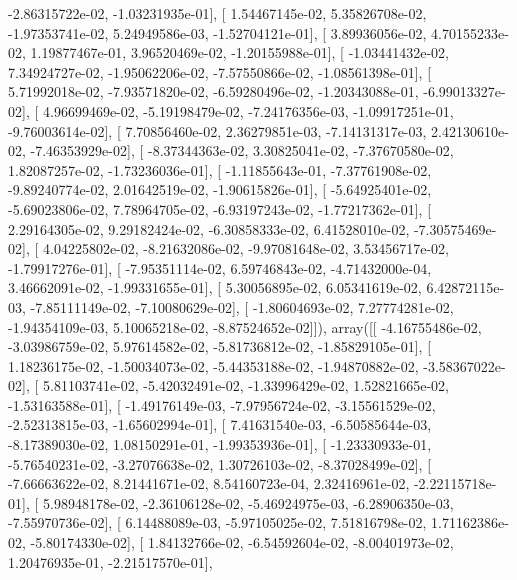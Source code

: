 \documentclass{article}
\begin{document}
         -2.86315722e-02,  -1.03231935e-01],
       [  1.54467145e-02,   5.35826708e-02,  -1.97353741e-02,
          5.24949586e-03,  -1.52704121e-01],
       [  3.89936056e-02,   4.70155233e-02,   1.19877467e-01,
          3.96520469e-02,  -1.20155988e-01],
       [ -1.03441432e-02,   7.34924727e-02,  -1.95062206e-02,
         -7.57550866e-02,  -1.08561398e-01],
       [  5.71992018e-02,  -7.93571820e-02,  -6.59280496e-02,
         -1.20343088e-01,  -6.99013327e-02],
       [  4.96699469e-02,  -5.19198479e-02,  -7.24176356e-03,
         -1.09917251e-01,  -9.76003614e-02],
       [  7.70856460e-02,   2.36279851e-03,  -7.14131317e-03,
          2.42130610e-02,  -7.46353929e-02],
       [ -8.37344363e-02,   3.30825041e-02,  -7.37670580e-02,
          1.82087257e-02,  -1.73236036e-01],
       [ -1.11855643e-01,  -7.37761908e-02,  -9.89240774e-02,
          2.01642519e-02,  -1.90615826e-01],
       [ -5.64925401e-02,  -5.69023806e-02,   7.78964705e-02,
         -6.93197243e-02,  -1.77217362e-01],
       [  2.29164305e-02,   9.29182424e-02,  -6.30858333e-02,
          6.41528010e-02,  -7.30575469e-02],
       [  4.04225802e-02,  -8.21632086e-02,  -9.97081648e-02,
          3.53456717e-02,  -1.79917276e-01],
       [ -7.95351114e-02,   6.59746843e-02,  -4.71432000e-04,
          3.46662091e-02,  -1.99331655e-01],
       [  5.30056895e-02,   6.05341619e-02,   6.42872115e-03,
         -7.85111149e-02,  -7.10080629e-02],
       [ -1.80604693e-02,   7.27774281e-02,  -1.94354109e-03,
          5.10065218e-02,  -8.87524652e-02]]), array([[ -4.16755486e-02,  -3.03986759e-02,   5.97614582e-02,
         -5.81736812e-02,  -1.85829105e-01],
       [  1.18236175e-02,  -1.50034073e-02,  -5.44353188e-02,
         -1.94870882e-02,  -3.58367022e-02],
       [  5.81103741e-02,  -5.42032491e-02,  -1.33996429e-02,
          1.52821665e-02,  -1.53163588e-01],
       [ -1.49176149e-03,  -7.97956724e-02,  -3.15561529e-02,
         -2.52313815e-03,  -1.65602994e-01],
       [  7.41631540e-03,  -6.50585644e-03,  -8.17389030e-02,
          1.08150291e-01,  -1.99353936e-01],
       [ -1.23330933e-01,  -5.76540231e-02,  -3.27076638e-02,
          1.30726103e-02,  -8.37028499e-02],
       [ -7.66663622e-02,   8.21441671e-02,   8.54160723e-04,
          2.32416961e-02,  -2.22115718e-01],
       [  5.98948178e-02,  -2.36106128e-02,  -5.46924975e-03,
         -6.28906350e-03,  -7.55970736e-02],
       [  6.14488089e-03,  -5.97105025e-02,   7.51816798e-02,
          1.71162386e-02,  -5.80174330e-02],
       [  1.84132766e-02,  -6.54592604e-02,  -8.00401973e-02,
          1.20476935e-01,  -2.21517570e-01],
\end{document}

